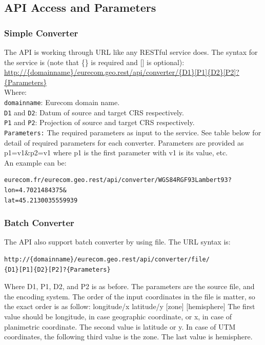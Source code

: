 \subsection{API Access and Parameters}
\label{sec:access}

\subsubsection{Simple Converter}
The API is working through URL like any RESTful service does. The syntax for the service is (note that \{\} is required and [] is optional):
\url{http://{domainname}/eurecom.geo.rest/api/converter/{D1}[P1]{D2}[P2]?{Parameters}} \\
Where: \\
\texttt{domainname}: Eurecom domain name.\\
\texttt{D1} and \texttt{D2}: Datum of source and target CRS respectively.\\
\texttt{P1} and \texttt{P2}: Projection of source and target CRS respectively.\\
\texttt{Parameters:} The required parameters as input to the service. See table below for detail of required parameters for each converter. Parameters are provided as p1=v1\&p2=v1 where p1 is the first parameter with v1 is its value, etc.\\
An example can be:
\begin{verbatim}
eurecom.fr/eurecom.geo.rest/api/converter/WGS84RGF93Lambert93?lon=4.7021484375&
lat=45.2130035559939
\end{verbatim}

\subsubsection{Batch Converter}
The API also support batch converter by using file. The URL syntax is:
\begin{verbatim}
http://{domainname}/eurecom.geo.rest/api/converter/file/
{D1}[P1]{D2}[P2]?{Parameters}
\end{verbatim}

Where D1, P1, D2, and P2 is as before. The parameters are the source file, and the encoding system. 
The order of the input coordinates in the file is matter, so the exact order is as follow:
{longitude/x} {latitude/y} [zone] [hemisphere]
The first value should be longitude, in case geographic coordinate, or x, in case of planimetric coordinate. The second value is latitude or y. In case of UTM coordinates, the following third value is the zone. The last value is hemisphere. 

